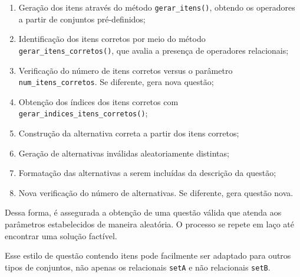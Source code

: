 \begin{enumerate}
    \item Geração dos itens através do método \verb|gerar_itens()|, obtendo os operadores a partir de conjuntos pré-definidos;
    \item Identificação dos itens corretos por meio do método \verb|gerar_itens_corretos()|, que avalia a presença de operadores relacionais;
    \item Verificação do número de itens corretos versus o parâmetro \verb|num_itens_corretos|. Se diferente, gera nova questão;
    \item Obtenção dos índices dos itens corretos com \verb|gerar_indices_itens_corretos()|;
    \item Construção da alternativa correta a partir dos itens corretos;
    \item Geração de alternativas inválidas aleatoriamente distintas;
    \item Formatação das alternativas a serem incluídas da descrição da questão;
    \item Nova verificação do número de alternativas. Se diferente, gera questão nova.
\end{enumerate}

Dessa forma, é assegurada a obtenção de uma questão válida que atenda aos parâmetros estabelecidos de maneira aleatória. O processo se repete em laço até encontrar uma solução factível.

Esse estilo de questão contendo itens pode facilmente ser adaptado para outros tipos de conjuntos, não apenas os relacionais \verb|setA| e não relacionais \verb|setB|.

